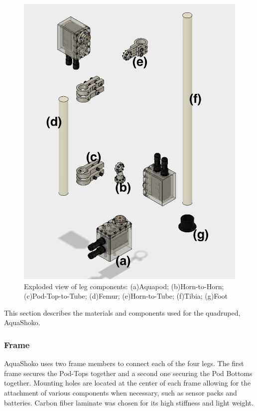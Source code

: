 \begin{figure}
\centering
\includegraphics[width=1.0\columnwidth]{./img/aquaShoko-v3dot3-exploded-leg.png}
\caption{Exploded view of leg components: (a)Aquapod; (b)Horn-to-Horn; (c)Pod-Top-to-Tube; (d)Femur; (e)Horn-to-Tube; (f)Tibia; (g)Foot}
\label{fig:leg exploded}
\end{figure}




This section describes the materials and components used for the quadruped, AquaShoko.

\subsubsection{Frame}
AquaShoko uses two frame members to connect each of the four legs. The first frame secures the Pod-Tops together and a second one securing the Pod Bottoms together. Mounting holes are located at the center of each frame allowing for the attachment of various components when necessary, such as sensor packs and batteries. Carbon fiber laminate was chosen for its high stiffness and light weight.
